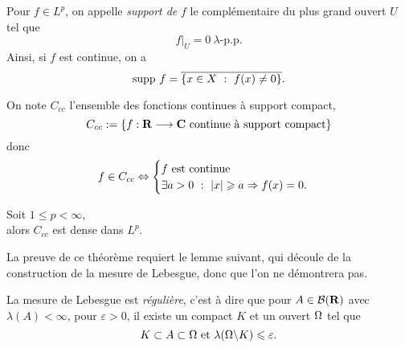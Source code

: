 \documentclass[a4paper,11pt, twoside]{article}
\begin{document}
\begin{Def}
  Pour $f\in L^p$, on appelle \emph{support de }$f$ le complémentaire du plus grand ouvert $U$ tel que 
  $$f\big|_U=0\ \lambda\text{-p.p.}$$
  Ainsi, si $f$ est continue, on a 
  $$\mathrm{supp}\ f=\overline{\ens{x\in X\ :\ f(x)\neq 0}}.$$
\end{Def}


On note $C_{cc}$ l'ensemble des fonctions continues à support compact, 
$$C_{cc}:=\left\{f:\mathbf R\longrightarrow\mathbf C\text{ continue à support compact}\right\}$$
donc 
$$f\in C_{cc}\Leftrightarrow\begin{cases}
  f\text{ est continue }\\
  \exists a>0\ :\ \left| x\right|\geqslant a\Rightarrow f(x)=0.
\end{cases}$$


\begin{Th}
  Soit $1\leqslant p< \infty$,\\

  alors $C_{cc}$ est dense dans $L^p$.
\end{Th}


La preuve de ce théorème requiert le lemme suivant, qui découle de la construction de la mesure de Lebesgue, donc que l'on ne démontrera pas.


\begin{lemme}
  La mesure de Lebesgue est \emph{régulière}, c'est à dire que pour $A\in\mathcal B(\mathbf R)$ avec $\lambda(A)<\infty$, pour $\varepsilon>0$, il existe un compact $K$ et un ouvert $\Omega$ tel que 
  $$K\subset A\subset \Omega\text{ et }\lambda(\Omega\backslash K)\leqslant \varepsilon.$$
\end{lemme}
\end{document}
